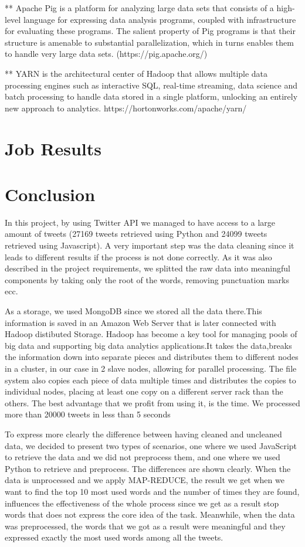 \documentclass{article}
\begin{document}
        ** Apache Pig is a platform for analyzing large data sets that consists of a high-level language for expressing data analysis programs, coupled with infrastructure for evaluating these programs. 
        The salient property of Pig programs is that their structure is amenable to substantial parallelization, which in turns enables them to handle very large data sets. 
        (https://pig.apache.org/)

        ** YARN is the architectural center of Hadoop that allows multiple data processing engines such as interactive SQL, real-time streaming, data science and batch processing to handle data stored 
        in a single platform, unlocking an entirely new approach to analytics.
        https://hortonworks.com/apache/yarn/
        \section{Job Results}
		\pagebreak        
        \section{Conclusion}
In this project, by using Twitter API we managed to have access to a large amount of tweets (27169 tweets retrieved using Python and 24099 tweets retrieved using Javascript). A very important step was the data cleaning since it leads to different results if the process is not done correctly. As it was also described in the project requirements, we splitted the raw data into meaningful components by taking only the root of the words, removing punctuation marks ecc.

 As a storage, we used MongoDB since we stored all the data there.This information is saved in an Amazon Web Server that is later connected with Hadoop distibuted Storage. Hadoop has become a key tool for managing pools of big data and supporting big data analytics applications.It takes the data,breaks the information down into separate pieces and distributes them to different nodes in a cluster, in our case in 2 slave nodes, allowing for parallel processing. The file system also copies each piece of data multiple times and distributes the copies to individual nodes, placing at least one copy on a different server rack than the others. The best advantage that we profit from using it, is the time. We processed more than 20000 tweets in less than 5 seconds

To express more clearly the difference between having cleaned and uncleaned data, we decided to present two types of scenarios, one where we used JavaScript to retrieve the data and we did not preprocess them, and one where we used Python to retrieve and preprocess. The differences are shown clearly. When the data is unprocessed and we apply MAP-REDUCE, the result we get when we want to find the top 10 most used words and the number of times they are found, influences the effectiveness of the whole process since we get as a result stop words that does not express the core idea of the task. Meanwhile, when the data was preprocessed, the words that we got as a result were meaningful and they expressed exactly the most used words among all the tweets.


        
        
        \nocite{*}

    
\end{document}
